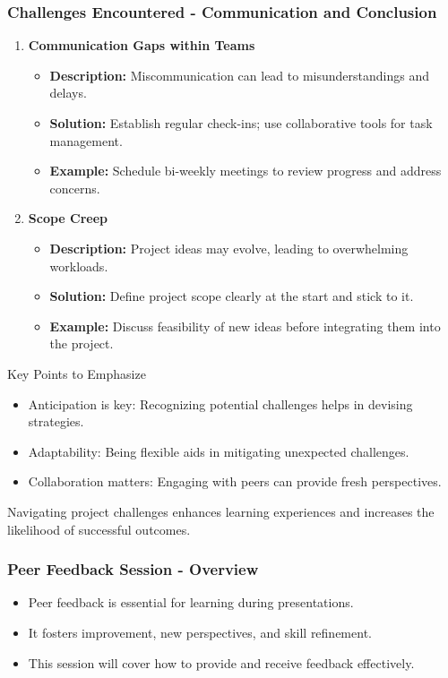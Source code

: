 \documentclass[aspectratio=169]{beamer}
\begin{document}
\begin{frame}[fragile]
    \frametitle{Challenges Encountered - Communication and Conclusion}
    \begin{enumerate}[resume]
        \item \textbf{Communication Gaps within Teams}
        \begin{itemize}
            \item \textbf{Description:} Miscommunication can lead to misunderstandings and delays.
            \item \textbf{Solution:} Establish regular check-ins; use collaborative tools for task management.
            \item \textbf{Example:} Schedule bi-weekly meetings to review progress and address concerns.
        \end{itemize}

        \item \textbf{Scope Creep}
        \begin{itemize}
            \item \textbf{Description:} Project ideas may evolve, leading to overwhelming workloads.
            \item \textbf{Solution:} Define project scope clearly at the start and stick to it.
            \item \textbf{Example:} Discuss feasibility of new ideas before integrating them into the project.
        \end{itemize}
    \end{enumerate}

    \begin{block}{Key Points to Emphasize}
        \begin{itemize}
            \item Anticipation is key: Recognizing potential challenges helps in devising strategies.
            \item Adaptability: Being flexible aids in mitigating unexpected challenges.
            \item Collaboration matters: Engaging with peers can provide fresh perspectives.
        \end{itemize}
    \end{block}

    Navigating project challenges enhances learning experiences and increases the likelihood of successful outcomes.
\end{frame}

\begin{frame}[fragile]
    \frametitle{Peer Feedback Session - Overview}
    \begin{itemize}
        \item Peer feedback is essential for learning during presentations.
        \item It fosters improvement, new perspectives, and skill refinement.
        \item This session will cover how to provide and receive feedback effectively.
    \end{itemize}
\end{frame}
\end{document}
